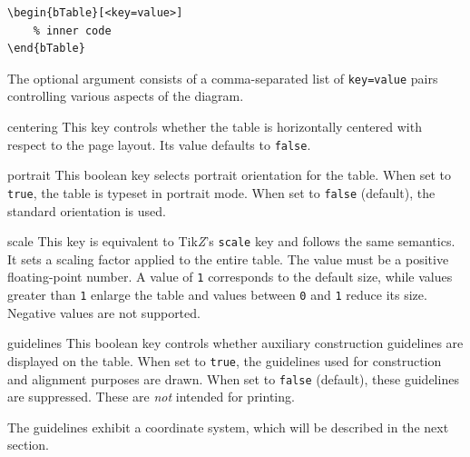 \documentclass[11pt,a4paper]{ltxdoc}
\begin{document}
\begin{minipage}{.57\linewidth}
    \begin{bTable}[scale=.9]
    \end{bTable}
\end{minipage}
\begin{minipage}{.43\linewidth}
    \begin{verbatim}
\begin{bTable}[<key=value>]
    % inner code
\end{bTable}
    \end{verbatim}
\end{minipage}\medskip

The optional argument consists of a comma-separated list of \texttt{key=value} pairs controlling various aspects of the diagram.

\begin{macro}{centering}
    This key controls whether the table is horizontally centered with respect to the page layout. Its value defaults to \texttt{false}.
\end{macro}

\begin{macro}{portrait}
    This boolean key selects portrait orientation for the table. When set to \texttt{true}, the table is typeset in portrait mode. When set to \texttt{false} (default), the standard orientation is used.
\end{macro}

\begin{macro}{scale}
    This key is equivalent to Tik\textit{Z}’s \texttt{scale} key and follows the same semantics. It sets a scaling factor applied to the entire table. The value must be a positive floating-point number. A value of \texttt{1} corresponds to the default size, while values greater than \texttt{1} enlarge the table and values between \texttt{0} and \texttt{1} reduce its size. Negative values are not supported.
\end{macro}

\begin{macro}{guidelines}
    This boolean key controls whether auxiliary construction guidelines are displayed on the table. When set to \texttt{true}, the guidelines used for construction and alignment purposes are drawn. When set to \texttt{false} (default), these guidelines are suppressed. These are \textit{not} intended for printing.

    \begin{bTable}
    \end{bTable}

    The guidelines exhibit a coordinate system, which will be described in the next section.
\end{macro}
\end{document}

